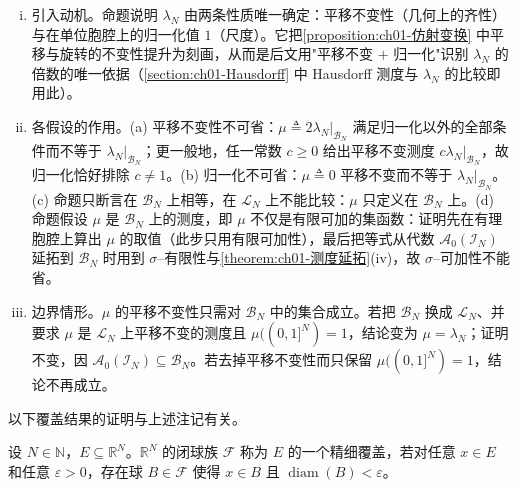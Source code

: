 \documentclass[../../main.tex]{subfiles}%
\begin{document}
\begin{remark}\label{remark:ch01-平移不变唯一性}
\begin{enumerate}[(i)]
\item 引入动机。命题说明 $\lambda_N$ 由两条性质唯一确定：平移不变性（几何上的齐性）与在单位胞腔上的归一化值 $1$（尺度）。它把\cref{proposition:ch01-仿射变换} 中平移与旋转的不变性提升为刻画，从而是后文用"平移不变 $+$ 归一化"识别 $\lambda_N$ 的倍数的唯一依据（\cref{section:ch01-Hausdorff} 中 Hausdorff 测度与 $\lambda_N$ 的比较即用此）。
\item 各假设的作用。(a) 平移不变性不可省：$\mu\triangleq2\lambda_N|_{\mathcal{B}_N}$ 满足归一化以外的全部条件而不等于 $\lambda_N|_{\mathcal{B}_N}$；更一般地，任一常数 $c\geqslant0$ 给出平移不变测度 $c\lambda_N|_{\mathcal{B}_N}$，故归一化恰好排除 $c\neq1$。(b) 归一化不可省：$\mu\triangleq0$ 平移不变而不等于 $\lambda_N|_{\mathcal{B}_N}$。(c) 命题只断言在 $\mathcal{B}_N$ 上相等，在 $\mathcal{L}_N$ 上不能比较：$\mu$ 只定义在 $\mathcal{B}_N$ 上。(d) 命题假设 $\mu$ 是 $\mathcal{B}_N$ 上的测度，即 $\mu$ 不仅是有限可加的集函数：证明先在有理胞腔上算出 $\mu$ 的取值（此步只用有限可加性），最后把等式从代数 $\mathcal{A}_0(\mathcal{I}_N)$ 延拓到 $\mathcal{B}_N$ 时用到 $\sigma$--有限性与\cref{theorem:ch01-测度延拓}(iv)，故 $\sigma$--可加性不能省。
\item 边界情形。$\mu$ 的平移不变性只需对 $\mathcal{B}_N$ 中的集合成立。若把 $\mathcal{B}_N$ 换成 $\mathcal{L}_N$、并要求 $\mu$ 是 $\mathcal{L}_N$ 上平移不变的测度且 $\mu((0,1]^N)=1$，结论变为 $\mu=\lambda_N$；证明不变，因 $\mathcal{A}_0(\mathcal{I}_N)\subseteq\mathcal{B}_N$。若去掉平移不变性而只保留 $\mu((0,1]^N)=1$，结论不再成立。
\end{enumerate}
\end{remark}

以下覆盖结果的证明与上述注记有关。

\begin{definition}\label{definition:ch01-精细覆盖}
设 $N\in\mathbb{N}$，$E\subseteq\mathbb{R}^N$。$\mathbb{R}^N$ 的闭球族 $\mathcal{F}$ 称为 $E$ 的一个精细覆盖，若对任意 $x\in E$ 和任意 $\varepsilon>0$，存在球 $B\in\mathcal{F}$ 使得 $x\in B$ 且 $\operatorname{diam}(B)<\varepsilon$。
\end{definition}
\end{document}
